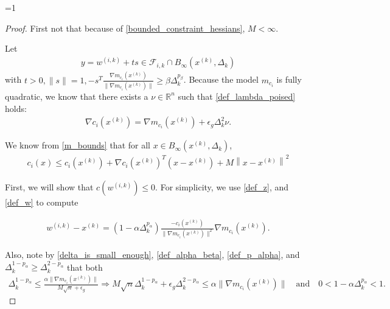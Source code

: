 \documentclass{article}
\theoremstyle{case}
\newcommand{\xk}{{x^{(k)}}}
\newcommand{\dk}{\Delta_k}
\newcommand{\zik}{{z^{(i, k)}}}
\newcommand{\fik}{{\mathcal F_{i, k}}}
\newcommand{\rn}{{\mathbb R^{n}}}
\newcommand{\wik}{{w^{(i, k)}}}
\newcommand{\gmcik}{{\nabla m_{c_i}(\xk)}}
\newcommand{\hgik}{{\frac{\nabla m_{c_i}(\xk)}{\|\nabla m_{c_i}(\xk)\|}}}
\newcommand{\tr}{{ B_{\infty}\left(\xk, \dk\right) }}
\def\includeproofs{1}
\begin{document}
\ifnum\includeproofs=1
\begin{proof}
First not that because of \cref{bounded_constraint_hessians}, $M < \infty$.

Let 
\begin{align}
y = \wik + ts \in \fik \cap \tr \label{t_is_bounded}
\end{align}
with $t > 0, \|s\| = 1, -s^T\hgik \ge \beta \dk^{p_{\beta}}$.
Because the model $m_{c_i}$ is fully quadratic, we know that there exists a $\nu\in\rn$ such that \cref{def_lambda_poised} holds:
\begin{align}
\nabla c_i(\xk) = \nabla m_{c_i}(\xk) + \epsilon_{g}\dk^2\nu. \label{model_error_for_gradient}
\end{align}

We know from \cref{m_bounds} that for all $x \in \tr$,
\begin{align}
c_i(x) \le c_i(\xk) + \nabla c_i(\xk)^T(x - \xk) + M \left \|x - \xk \right\|^2 \label{constraint_lower_bound}
\end{align}

First, we will show that $c(\wik) \le 0$.
For simplicity, we use \cref{def_z}, and \cref{def_w} to compute


\begin{align}
\wik - \xk = \left(1 - \alpha \dk^{p_{\alpha} }\right)\frac{-c_i(\xk)}{\|\gmcik\|^2}\gmcik. \label{simple_computation}
\end{align}

Also, note by \cref{delta_is_small_enough}, \cref{def_alpha_beta}, \cref{def_p_alpha}, and $\dk^{1 - p_{\alpha}} \ge \dk^{2 - p_{\alpha}}$ that both
\begin{align*}
\dk^{1-p_{\alpha}} \le \frac{\alpha \|\gmcik\|}{M \sqrt{n} + \epsilon_g} \Longrightarrow 
M \sqrt{n}\dk^{1- p_{\alpha}} + \epsilon_g \dk^{2 - p_{\alpha}} \le \alpha \|\gmcik\| \quad \text{and} \quad
0 < 1 - \alpha \dk^{p_{\alpha}} < 1.
\end{align*}


\end{proof}
\end{document}

